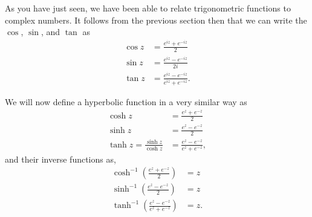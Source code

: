 As you have just seen, we have been able to relate trigonometric functions to
complex numbers.  It follows from the previous section then that we can write
the $\cos$, $\sin$, and $\tan$ as
\begin{align*}
    \cos z & = \frac{e^{i z} + e^{-i z}}{2} \\
    \sin z & = \frac{e^{i z} - e^{-i z}}{2i} \\
    \tan z & = \frac{e^{i z} - e^{-i z}}{e^{i z} + e^{-i z}}.
\end{align*}

We will now define a hyperbolic function in a very similar way as
\begin{align*}
    \cosh z & = \frac{e^{z} + e^{-z}}{2} \\
    \sinh z & = \frac{e^{z} - e^{-z}}{2} \\
    \tanh z = \frac{\sinh z}{\cosh z} & = \frac{e^{z} - e^{-z}}{e^{z} + e^{-z}},
\end{align*}
and their inverse functions as,
\begin{align*}
    \cosh^{-1} \left(\frac{e^{z} + e^{-z}}{2}\right) & = z \\
    \sinh^{-1} \left(\frac{e^{z} - e^{-z}}{2}\right) & = z \\
    \tanh^{-1} \left(\frac{e^{z} - e^{-z}}{e^{z} + e^{-z}}\right) & = z. \\
\end{align*}
